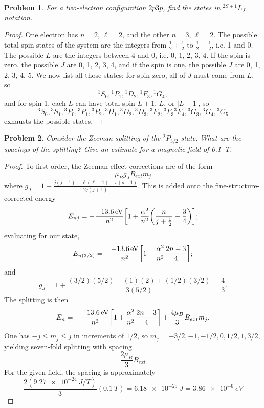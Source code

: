 \documentclass{article}
\newtheorem{plm}{Problem}
\begin{document}
\begin{plm}
  For a two-electron configuration $2p3p$, find the states in $^{2S+1}L_{J}$ notation.
\end{plm}

\begin{proof}
  One electron has $n = 2$, $\ell = 2$, and the other $n = 3$, $\ell = 2$.
  The possible total spin states of the system are the integers from $\frac{1}{2} + \frac{1}{2}$ to $\frac{1}{2} - \frac{1}{2}$, i.e. 1 and 0.
  The possible $L$ are the integers between $4$ and $0$, i.e. 0, 1, 2, 3, 4.
  If the spin is zero, the possible $J$ are 0, 1, 2, 3, 4, and if the spin is one, the possible $J$ are 0, 1, 2, 3, 4, 5.
  We now list all those states: for spin zero, all of $J$ must come from $L$, so
  \[
    {}^{1}S_{0}, {}^{1}P_{1}, {}^{1}D_{2}, {}^{1}F_{3}, {}^{1}G_{4},
  \]
  and for spin-1, each $L$ can have total spin $L + 1$, $L$, or $|L - 1|$, so
  \[
    {}^{3}S_{0}, {}^{3}S_{1}, {}^{3}P_{0}, {}^{3}P_{1}, {}^{3}P_{2}, {}^{3}D_{1}, {}^{3}D_{2}, {}^{3}D_{3}, {}^{3}F_{2}, {}^{3}F_{3} {}^{3}F_{4},
    {}^{3}G_{3}, {}^{3}G_{4}, {}^{3}G_{5}
  \]
  exhausts the possible states.
\end{proof}

\begin{plm}
  Consider the Zeeman splitting of the $^{2}P_{3/2}$ state.
  What are the spacings of the splitting?
  Give an estimate for a magnetic field of \SI{0.1}{T}.
\end{plm}

\begin{proof}
  To first order, the Zeeman effect corrections are of the form
  \[
    \mu_{B}g_{J}B_{ext}m_{j}
  \]
  where $g_{J} = 1 + \frac{j(j+1) - \ell(\ell + 1) + s(s + 1)}{2j(j + 1)}$.
  This is added onto the fine-structure-corrected energy
  \[
    E_{nj} = -\frac{\SI{-13.6}{eV}}{n^{2}}\qty[1 + \frac{\alpha^{2}}{n^{2}}\qty(\frac{n}{j + \frac{1}{2}} - \frac{3}{4})];
  \]
  evaluating for our state,
  \[
    E_{n(3/2)} = -\frac{\SI{-13.6}{eV}}{n^{2}}\qty[1 + \frac{\alpha^{2}}{n^{2}}\frac{2n - 3}{4}];
  \]
  and
  \[
    g_{J} = 1 + \frac{(3/2)(5/2) - (1)(2) + (1/2)(3/2)}{3(5/2)} = \frac{4}{3}.
  \]
  The splitting is then
  \[
    E_{n} = -\frac{\SI{-13.6}{eV}}{n^{2}}\qty[1 + \frac{\alpha^{2}}{n^{2}}\frac{2n - 3}{4}] + \frac{4\mu_{B}}{3}B_{ext}m_{j}.
  \]
  One has $-j \leq m_{j} \leq j$ in increments of $1/2$, so $m_{j} = -3/2, -1, -1/2, 0, 1/2, 1, 3/2$, yielding seven-fold splitting with spacing
  \[
    \frac{2\mu_{B}}{3}B_{ext}
  \]
  For the given field, the spacing is approximately
  \[
    \frac{2(\SI{9.27e-24}{J/T})}{3}(\SI{0.1}{T}) = \SI{6.18e-25}{J} = \SI{3.86e-6}{eV}
  \]
\end{proof}
\end{document}
